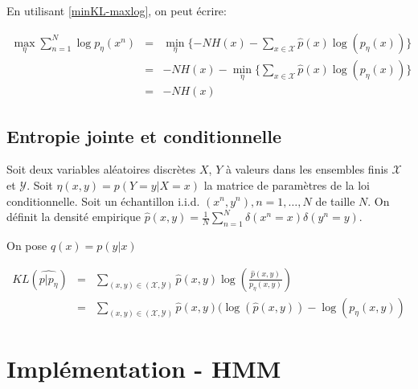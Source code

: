 \documentclass{article}
\begin{document}
En utilisant \ref{minKL-maxlog}, on peut écrire:

\begin{align}
\max_{\eta} \sum_{n = 1}^N \log p_{\eta}(x^n) & = & \min_{\eta} \{- NH(x) - \sum_{x \in \mathcal{X}} \hat{p}(x) \log(p_{\eta}(x))\} \\
					      & = & - NH(x) - \min_{\eta} \{\sum_{x \in \mathcal{X}} \hat{p}(x) \log(p_{\eta}(x))\} \\
					      & = & - NH(x)
\end{align}

\subsection{Entropie jointe et conditionnelle}

Soit deux variables aléatoires discrètes $X$, $Y$ à valeurs dans les ensembles
finis $\mathcal{X}$ et $\mathcal{Y}$. Soit $\eta(x, y) = p(Y = y | X = x)$ la
matrice de paramètres de la loi conditionnelle. Soit un échantillon i.i.d.
$(x^n, y^n), n=1, \dots, N$ de taille $N$. On définit la densité empirique
$\hat{p}(x, y) = \frac{1}{N} \sum_{n=1}^N \delta(x^n = x) \delta(y^n = y)$.

On pose $q(x) = p(y | x)$

\begin{align}
KL(\hat{p | p_{\eta}} ) & = & \sum_{(x, y) \in (\mathcal{X}, \mathcal{Y})} \hat{p}(x, y) \log(\frac{\hat{p}(x, y)}{p_{\eta}(x, y)}) \\
			& = & \sum_{(x, y) \in (\mathcal{X}, \mathcal{Y})} \hat{p}(x, y) (\log(\hat{p}(x, y)) - \log(p_{\eta}(x, y))
\end{align}

\section{Implémentation - HMM}
\end{document}
